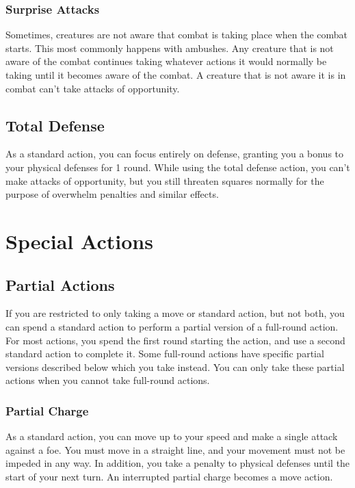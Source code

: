 \subsubsection{Surprise Attacks}\label{Surprise Attacks}
Sometimes, creatures are not aware that combat is taking place when the combat starts. This most commonly happens with ambushes. Any creature that is not aware of the combat continues taking whatever actions it would normally be taking until it becomes aware of the combat. A creature that is not aware it is in combat can't take attacks of opportunity.

\subsection{Total Defense}\label{Total Defense}
As a standard action, you can focus entirely on defense, granting you a  bonus to your physical defenses for 1 round. While using the total defense action, you can't make attacks of opportunity, but you still threaten squares normally for the purpose of overwhelm penalties and similar effects.

\section{Special Actions}

\subsection{Partial Actions}

If you are restricted to only taking a move or standard action, but not both, you can spend a standard action to perform a partial version of a full-round action. For most actions, you spend the first round starting the action, and use a second standard action to complete it. Some full-round actions have specific partial versions described below which you take instead. You can only take these partial actions when you cannot take full-round actions. 

\subsubsection{Partial Charge}
As a standard action, you can move up to your speed and make a single attack against a foe. You must move in a straight line, and your movement must not be impeded in any way. In addition, you take a  penalty to physical defenses until the start of your next turn. An interrupted partial charge becomes a move action.


